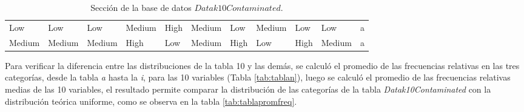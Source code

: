 \documentclass[mathematics,article,submit,moreauthors,pdftex]{mdpi}
\begin{document}
\begin{table}[!ht]
{\begin{tabular}{@{}lllllllllll@{}}
Low  & Low    & Low  & Medium & High & Medium & Low    & Medium & Low    & Low    & a                         \\
Medium                       & Medium                         & Medium                       & High                           & Low                          & Medium                         & High                           & Low                            & High                           & Medium                         & a \\ \bottomrule
\end{tabular}
}

\caption{Sección de la base de datos $Datak10Contaminated$.}

\label{tab:tabladatos}

\end{table}

Para verificar la diferencia entre las distribuciones de la tabla 10 y
las demás, se calculó el promedio de las frecuencias relativas en las
tres categorías, desde la tabla \emph{a} hasta la \emph{i}, para las 10
variables (Tabla \ref{tab:tablan}), luego se calculó el promedio de las
frecuencias relativas medias de las 10 variables, el resultado permite
comparar la distribución de las categorías de la tabla
\emph{Datak10Contaminated} con la distribución teórica uniforme, como se
observa en la tabla \ref{tab:tablapromfreq}.
\end{document}
